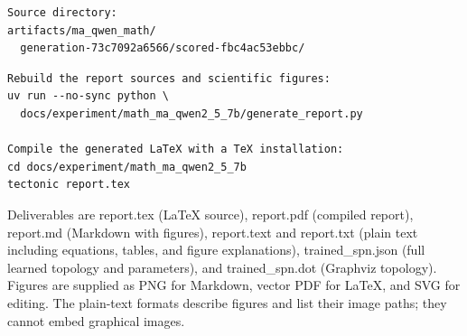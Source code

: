 \documentclass[11pt,a4paper]{article}
\begin{document}
\begin{verbatim}
Source directory:
artifacts/ma_qwen_math/
  generation-73c7092a6566/scored-fbc4ac53ebbc/
\end{verbatim}
\begin{verbatim}
Rebuild the report sources and scientific figures:
uv run --no-sync python \
  docs/experiment/math_ma_qwen2_5_7b/generate_report.py

Compile the generated LaTeX with a TeX installation:
cd docs/experiment/math_ma_qwen2_5_7b
tectonic report.tex
\end{verbatim}
Deliverables are report.tex (LaTeX source), report.pdf (compiled report), report.md (Markdown with figures), report.text and report.txt (plain text including equations, tables, and figure explanations), trained\_spn.json (full learned topology and parameters), and trained\_spn.dot (Graphviz topology). Figures are supplied as PNG for Markdown, vector PDF for LaTeX, and SVG for editing. The plain-text formats describe figures and list their image paths; they cannot embed graphical images.
\end{document}
